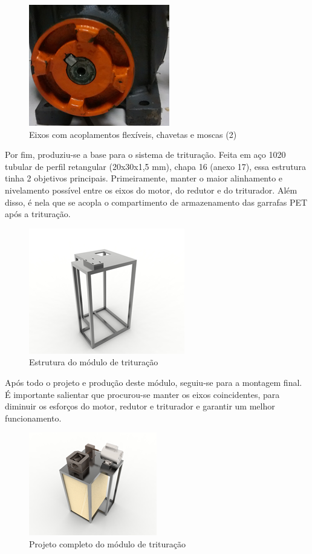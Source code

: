 \begin{figure}[!h]
	\centering
		\includegraphics[scale=0.4]{figuras/estrutura/18(2).png}
	\caption{Eixos com acoplamentos flexíveis, chavetas e moscas (2)}
\end{figure}

Por fim, produziu-se a base para o sistema de trituração. Feita em aço 1020 tubular de perfil retangular (20x30x1,5 mm), chapa 16 (anexo 17), essa estrutura tinha 2 objetivos principais. Primeiramente, manter o maior alinhamento e nivelamento possível entre os eixos do motor, do redutor e do triturador. Além disso, é nela que se acopla o compartimento de armazenamento das garrafas PET após a trituração.

\begin{figure}[!h]
	\centering
		\includegraphics[scale=0.4]{figuras/estrutura/19.png}
	\caption{Estrutura do módulo de trituração}
\end{figure}

Após todo o projeto e produção deste módulo, seguiu-se para a montagem final. É importante salientar que procurou-se manter os eixos coincidentes, para diminuir os esforços do motor, redutor e triturador e garantir um melhor funcionamento.

\begin{figure}[!h]
	\centering
		\includegraphics[scale=0.4]{figuras/estrutura/20(1).png}
	\caption{Projeto completo do módulo de trituração}
\end{figure}

